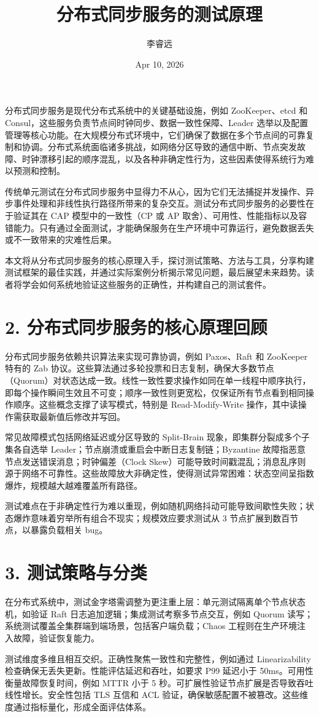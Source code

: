 \title{分布式同步服务的测试原理}
\author{李睿远}
\date{Apr 10, 2026}
\maketitle
分布式同步服务是现代分布式系统中的关键基础设施，例如 ZooKeeper、etcd 和 Consul，这些服务负责节点间时钟同步、数据一致性保障、Leader 选举以及配置管理等核心功能。在大规模分布式环境中，它们确保了数据在多个节点间的可靠复制和协调。分布式系统面临诸多挑战，如网络分区导致的通信中断、节点突发故障、时钟漂移引起的顺序混乱，以及各种非确定性行为，这些因素使得系统行为难以预测和控制。\par
传统单元测试在分布式同步服务中显得力不从心，因为它们无法捕捉并发操作、异步事件处理和非线性执行路径所带来的复杂交互。测试分布式同步服务的必要性在于验证其在 CAP 模型中的一致性（CP 或 AP 取舍）、可用性、性能指标以及容错能力。只有通过全面测试，才能确保服务在生产环境中可靠运行，避免数据丢失或不一致带来的灾难性后果。\par
本文将从分布式同步服务的核心原理入手，探讨测试策略、方法与工具，分享构建测试框架的最佳实践，并通过实际案例分析揭示常见问题，最后展望未来趋势。读者将学会如何系统地验证这些服务的正确性，并构建自己的测试套件。\par
\chapter{2. 分布式同步服务的核心原理回顾}
分布式同步服务依赖共识算法来实现可靠协调，例如 Paxos、Raft 和 ZooKeeper 特有的 Zab 协议。这些算法通过多轮投票和日志复制，确保大多数节点（Quorum）对状态达成一致。线性一致性要求操作如同在单一线程中顺序执行，即每个操作瞬间生效且不可变；顺序一致性则更宽松，仅保证所有节点看到相同操作顺序。这些概念支撑了读写模式，特别是 Read-Modify-Write 操作，其中读操作需获取最新值后修改并写回。\par
常见故障模式包括网络延迟或分区导致的 Split-Brain 现象，即集群分裂成多个子集各自选举 Leader；节点崩溃或重启会中断日志复制链；Byzantine 故障指恶意节点发送错误消息；时钟偏差（Clock Skew）可能导致时间戳混乱；消息乱序则源于网络不可靠性。这些故障放大非确定性，使得测试异常困难：状态空间呈指数爆炸，规模越大越难覆盖所有路径。\par
测试难点在于非确定性行为难以重现，例如随机网络抖动可能导致间歇性失败；状态爆炸意味着穷举所有组合不现实；规模效应要求测试从 3 节点扩展到数百节点，以暴露负载相关 bug。\par
\chapter{3. 测试策略与分类}
在分布式系统中，测试金字塔需调整为更注重上层：单元测试隔离单个节点状态机，如验证 Raft 日志追加逻辑；集成测试考察多节点交互，例如 Quorum 读写；系统测试覆盖全集群端到端场景，包括客户端负载；Chaos 工程则在生产环境注入故障，验证恢复能力。\par
测试维度多维且相互交织。正确性聚焦一致性和完整性，例如通过 Linearizability 检查确保无丢失更新。性能评估延迟和吞吐，如要求 P99 延迟小于 50ms。可用性衡量故障恢复时间，例如 MTTR 小于 5 秒。可扩展性验证节点扩展是否导致吞吐线性增长。安全性包括 TLS 互信和 ACL 验证，确保敏感配置不被篡改。这些维度通过指标量化，形成全面评估体系。\par
